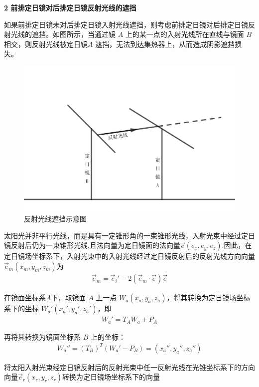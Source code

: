 \documentclass[../main.tex]{subfiles}
\begin{document}
\par \textbf{2 前排定日镜对后排定日镜反射光线的遮挡}
\par  如果前排定日镜未对后排定日镜入射光线遮挡，则考虑前排定日镜对后排定日镜反射光线的遮挡。如图所示，当通过镜 $A$ 上的某一点的入射光线所在直线与镜面 $B$ 相交，则反射光线被定日镜$A$ 遮挡，无法到达集热器上，从而造成阴影遮挡损失。
    \begin{figure}[H]
    \centering
    \includegraphics[width=.9\textwidth]{8}
    \caption{反射光线遮挡示意图}
    \label{1.29}
\end{figure}
\par 太阳光并非平行光线，而是具有一定锥形角的一束锥形光线，入射光束中经过定日镜反射后仍为一束锥形光线,且法向量为定日镜面的法向量$\vec{e}(e_x,e_y,e_z)$.因此，在定日镜场坐标系下，入射光束中的入射光线经过定日镜反射后的反射光线方向向量$\vec{e}_m(x_m, y_m, z_m)$为
\begin{align}  \label{1.30}
\vec{e}_m = \vec{e}_i' - 2 (\vec{e}_m \cdot \vec{e}) \vec{e}
\end{align}
\par 在镜面坐标系$A$下，取镜面 \( A \) 上一点 \( W_a (x_a,y_a,z_a) \)，将其转换为定日镜场坐标系下的坐标 \( W_a' (x_a', y_a', z_a') \)，即
\begin{align}\label{1.30}
   W_a' = T_A W_a + P_A
\end{align}
\par 再将其转换为镜面坐标系 \( B \) 上的坐标：
\begin{align}\label{1.31}
 W_a'' = (T_B)^T (W_a' - P_B)=(x_a'', y_a'', z_a'')
\end{align}
\par 将太阳入射光束经定日镜反射后的反射光束中任一反射光线在光锥坐标系下的方向向量$\vec{e}_r(x_r, y_r, z_r)$转换为定日镜场坐标系下的向量
\end{document}
